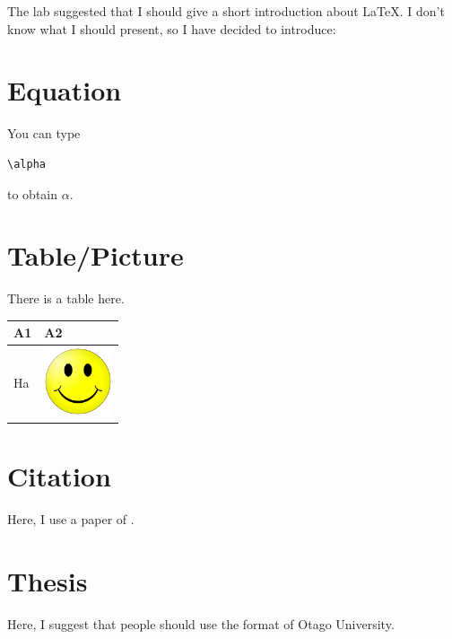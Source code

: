 \documentclass[12pt]{article}
\begin{document}
The lab suggested that I should give a short introduction about \LaTeX. 
I don't know what I should present, so I have decided to introduce:

\section{Equation}

You can type \begin{verbatim}\alpha \end{verbatim} to obtain $\alpha$.
\section{Table/Picture}

There is a table here.

\begin{tabular}{|p{3cm}|p{6cm}|}
\hline
A1 & A2\\
\hline
Ha & \includegraphics[width = 2cm, height = 2cm]{SmileFace} \\
\hline
\end{tabular}


\section{Citation}

Here, I use a paper of \cite{chang2015core}.

\section{Thesis}

Here, I suggest that people should use the format of Otago University.


\end{document}
